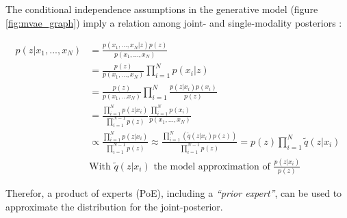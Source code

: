 \documentclass[12pt]{report}
\begin{document}
The conditional independence assumptions in the generative model (figure \ref{fig:mvae_graph}) imply a relation among joint- and single-modality posteriors :

\begin{equation}
    \begin{split}
        p(z|x_1, ..., x_N) & = \frac{p(x_1, ..., x_N | z) p(z)}{p(x_1, ..., x_N)} \\
        & = \frac{p(z)}{p(x_1, ..., x_N)} \prod_{i=1}^{N} p(x_i | z) \\
        & = \frac{p(z)}{p(x_1, ... x_N)} \prod_{i=1}^{N} \frac{p(z|x_i)p(x_i)}{p(z)} \\
        & = \frac{\prod_{i=1}^{N} p(z|x_i)}{\prod_{i=1}^{N-1} p(z)} \frac{\prod_{i=1}^{N}p(x_i)}{p(x_1, ..., x_N)} \\
        & \propto \frac{\prod_{i=1}^{N} p(z|x_i)}{\prod_{i=1}^{N-1} p(z)}
        \approx \frac{\prod_{i=1}^{N} (\widetilde{q}(z|x_i)p(z))}{\prod_{i=1}^{N-1} p(z)}
        = p(z) \prod_{i=1}^{N} \widetilde{q}(z | x_i) \\
        & \text{With $\widetilde{q}(z|x_i)$ the model approximation of $\frac{p(z|x_i)}{p(z)}$}
    \label{eq:poe}
    \end{split}
\end{equation}

Therefor, a product of experts (PoE), including a \textit{“prior expert”}, can be used to approximate the distribution for the joint-posterior.
\end{document}
